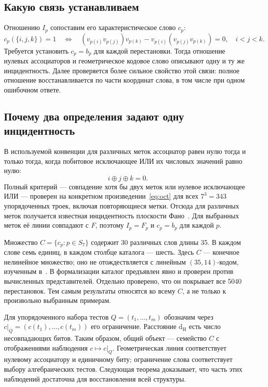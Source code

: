 \documentclass[11pt,a4paper]{article}
\numberwithin{equation}{section}
\theoremstyle{definition}
\theoremstyle{remark}
\newcommand{\Ham}{\mathrm{d}_{\mathrm H}}
\begin{document}
\subsection{Какую связь устанавливаем}
Отношению $I_p$ сопоставим его характеристическое слово $c_p$:
\begin{equation}\label{eq:incidence}
 c_p(\{i,j,k\})=1\quad\Longleftrightarrow\quad
 (v_{p(i)}v_{p(j)})v_{p(k)}-v_{p(i)}(v_{p(j)}v_{p(k)})=0,
 \quad i<j<k.
\end{equation}
Требуется установить $c_p=b_p$ для каждой перестановки.
Тогда отношение нулевых ассоциаторов и геометрическое кодовое слово
описывают одну и ту же инцидентность. Далее проверяется более сильное
свойство этой связи: полное отношение восстанавливается по части
координат слова, в том числе при одном ошибочном ответе.

\subsection{Почему два определения задают одну инцидентность}
В используемой конвенции для различных меток ассоциатор равен нулю
тогда и только тогда, когда побитовое исключающее ИЛИ их числовых
значений равно нулю:
\[
 i\mathbin{\oplus}j\mathbin{\oplus}k=0.
\]
Полный критерий --- совпадение хотя бы двух меток или нулевое
исключающее ИЛИ --- проверен на конкретном произведении~\eqref{eq:oct}
для всех $7^3=343$ упорядоченных троек, включая повторяющиеся метки.
Отсюда для различных меток получается известная инцидентность
плоскости Фано~\cite{baez}. Для выбранных меток её линии совпадают
с $F$, поэтому $I_p=F_p$ и $c_p=b_p$ для каждой $p$.

Множество $C=\{c_p:p\in S_7\}$ содержит 30 различных слов длины 35.
В каждом слове семь единиц, в каждом столбце каталога --- шесть.
Здесь $C$ --- конечное нелинейное множество; оно не отождествляется
с линейным $(35,14)$-кодом, изученным в~\cite{liebler}.
В формализации каталог предъявлен явно и проверен против вычисленных
представителей. Отдельно проверено, что он покрывает все 5040
перестановок. Тем самым результаты относятся ко всему $C$,
а не только к произвольно выбранным примерам.

Для упорядоченного набора тестов $Q=(t_1,\ldots,t_m)$ обозначим
через $c|_Q=(c(t_1),\ldots,c(t_m))$ его ограничение.
Расстояние $\Ham$ есть число несовпадающих битов.
Таким образом, общий объект --- семейство $C$ с отображениями
наблюдения $c\mapsto c|_Q$. Геометрическая линия соответствует
нулевому ассоциатору и единичному биту; ограничение слова соответствует
выбору алгебраических тестов. Следующая теорема доказывает, что
часть этих наблюдений достаточна для восстановления всей структуры.
\end{document}
